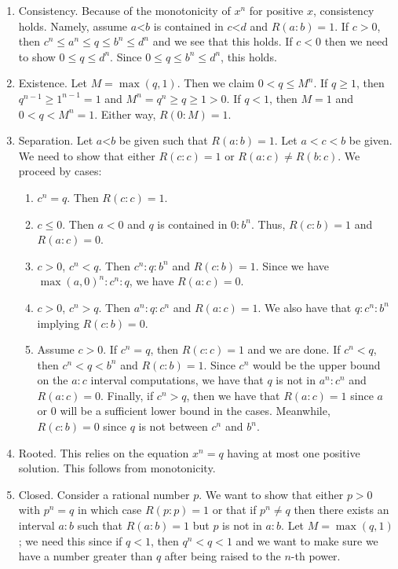 \documentclass[12pt]{article}
\theoremstyle{remark}
\newcommand{\lt}{\mathord{<}}
\begin{document}
\begin{enumerate}
    \item Consistency. Because of the monotonicity of $x^n$ for positive $x$, consistency holds. Namely, assume $a\lt b$ is contained in $c \lt d$ and $R(a:b)=1$. If $c>0$, then $c^n \leq a^n \leq q \leq b^n \leq d^n$ and we see that this holds. If $c<0$ then we need to show $0 \leq q \leq d^n$. Since $0 \leq q \leq  b^n \leq d^n$, this holds. 
    \item Existence. Let $M = \max(q, 1)$. Then we claim $0 < q \leq M^n$. If $q \geq 1$, then $q^{n-1} \geq 1^{n-1} = 1$ and $M^n = q^n \geq q \geq 1 > 0$. If $ q < 1$, then $M=1$ and $0 < q < M^n = 1$. Either way, $R(0:M) = 1$. 
    \item Separation. Let $a\lt b$ be given such that $R(a:b)=1$. Let $a < c <b$ be given. We need to show that either $R(c:c) = 1$ or $R(a:c) \neq R(b:c)$. We proceed by cases:
    \begin{enumerate}
        \item $c^n = q$. Then $R(c:c) =1$.
        \item $c \leq 0$. Then $a<0$ and $q$ is contained in $0:b^n$. Thus, $R(c:b) = 1$ and $R(a:c) = 0$. 
        \item $c>0$, $c^n <q$. Then $c^n:q:b^n$ and $R(c:b)=1$. Since we have $\max(a, 0)^n :c^n:q$, we have $R(a:c)=0$. 
        \item $c>0$, $c^n > q$. Then $a^n:q:c^n$ and $R(a:c) = 1$. We also have that $q:c^n:b^n$ implying $R(c:b)=0$.
        \item Assume $c>0$. If $c^n = q$, then $R(c:c)=1$ and we are done. If $c^n < q$, then $c^n < q< b^n$ and $R(c:b)=1$. Since $c^n$ would be the upper bound on the $a:c$ interval computations, we have that $q$ is not in $a^n:c^n$ and $R(a:c)=0$. Finally, if $c^n > q$, then we have that $R(a:c)=1$ since $a$ or $0$ will be a sufficient lower bound in the cases. Meanwhile, $R(c:b) = 0$ since $q$ is not between $c^n$ and $b^n$. 
    \end{enumerate}
     \item Rooted. This relies on the equation $x^n = q$ having at most one positive solution. This follows from monotonicity. 
    \item Closed. Consider a rational number $p$. We want to show that either $p>0$ with $p^n = q$ in which case $R(p:p)=1$ or that if $p^n \neq q$ then there exists an interval $a:b$ such that $R(a:b)=1$ but $p$ is not in $a:b$. Let $M = \max(q, 1)$; we need this since if $q<1$, then $q^n < q < 1$ and we want to make sure we have a number greater than $q$ after being raised to the $n$-th power. 
    

\end{enumerate}
\end{document}
